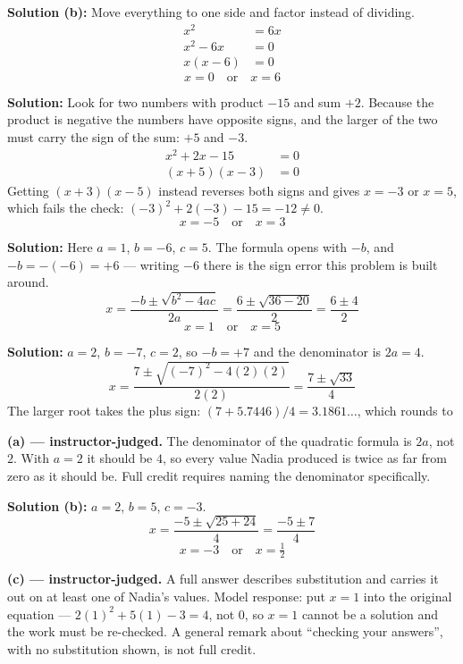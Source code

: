 \documentclass[12pt]{article}
\begin{document}
\textbf{Solution (b):} Move everything to one side and factor instead of dividing.
\begin{align*}
  x^2 &= 6x \\
  x^2 - 6x &= 0 \\
  x(x-6) &= 0
\end{align*}
\[ \boxed{x = 0 \quad \text{or} \quad x = 6} \]


\textbf{Solution:} Look for two numbers with product $-15$ and sum $+2$. Because the product is negative the numbers have opposite signs, and the larger of the two must carry the sign of the sum: $+5$ and $-3$.
\begin{align*}
  x^2 + 2x - 15 &= 0 \\
  (x+5)(x-3) &= 0
\end{align*}
Getting $(x+3)(x-5)$ instead reverses both signs and gives $x = -3$ or $x = 5$, which fails the check: $(-3)^2 + 2(-3) - 15 = -12 \neq 0$.
\[ \boxed{x = -5 \quad \text{or} \quad x = 3} \]


\textbf{Solution:} Here $a = 1$, $b = -6$, $c = 5$. The formula opens with $-b$, and $-b = -(-6) = +6$ --- writing $-6$ there is the sign error this problem is built around.
\[ x = \frac{-b \pm \sqrt{b^2-4ac}}{2a} = \frac{6 \pm \sqrt{36-20}}{2} = \frac{6 \pm 4}{2} \]
\[ \boxed{x = 1 \quad \text{or} \quad x = 5} \]


\textbf{Solution:} $a = 2$, $b = -7$, $c = 2$, so $-b = +7$ and the denominator is $2a = 4$.
\[ x = \frac{7 \pm \sqrt{(-7)^2 - 4(2)(2)}}{2(2)} = \frac{7 \pm \sqrt{33}}{4} \]
The larger root takes the plus sign: $(7 + 5.7446)/4 = 3.1861\ldots$, which rounds to 


\textbf{(a) --- instructor-judged.} The denominator of the quadratic formula is $2a$, not $2$. With $a = 2$ it should be $4$, so every value Nadia produced is twice as far from zero as it should be. Full credit requires naming the denominator specifically.

\textbf{Solution (b):} $a = 2$, $b = 5$, $c = -3$.
\[ x = \frac{-5 \pm \sqrt{25 + 24}}{4} = \frac{-5 \pm 7}{4} \]
\[ \boxed{x = -3 \quad \text{or} \quad x = \tfrac{1}{2}} \]

\textbf{(c) --- instructor-judged.} A full answer describes substitution and carries it out on at least one of Nadia's values. Model response: put $x = 1$ into the original equation --- $2(1)^2 + 5(1) - 3 = 4$, not $0$, so $x = 1$ cannot be a solution and the work must be re-checked. A general remark about ``checking your answers'', with no substitution shown, is not full credit.
\end{document}
